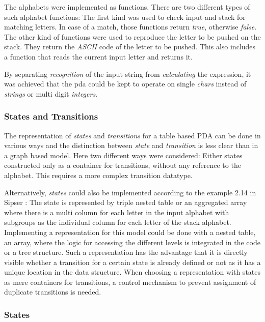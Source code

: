 \documentclass[a4paper,11pt,twoside]{article}
\begin{document}
The alphabets were implemented as functions. There are two different
types of such alphabet functions: The first kind was used to check
input and stack for matching letters. In case of a match, those
functions return \textit{true}, otherwise \textit{false}. The other
kind of functions were used to reproduce the letter to be pushed on the
stack. They return the \textit{ASCII} code of the letter to be pushed. This
also includes a function that reads the current input letter and  
returns it.

By separating \textit{recognition} of the input string from
\textit{calculating} the expression, it was achieved that the pda
could be kept to operate on single \textit{chars} instead of
\textit{strings} or multi digit \textit{integers}.  

\subsubsection{States and Transitions}
The representation of \textit{states} and \textit{transitions} for
a table based PDA can be done in various ways and the distinction
between \textit{state} and \textit{transition} is less clear than in a
graph based model. Here two different ways were considered: Either
states constructed only as a container for transitions, without any 
reference to the alphabet. This requires a more complex
transition datatype. 

Alternatively, \textit{states} could also be implemented according to
the example 2.14 in Sipser \cite[p. 114]{sipser2012}: The state is
represented by triple nested table or
an aggregated array where there is a multi column for each letter in
the input alphabet with subgroups as the individual column for each
letter of the stack alphabet. Implementing a representation for this
model could be done with a nested table, an array, where the logic for
accessing the different levels is integrated in the code or a tree
structure. Such a representation has the advantage that it is directly
visible whether a transition for a certain state is already defined or
not as it has a unique location in the data structure. When choosing a
representation with states as mere containers for transitions, a
control mechanism to prevent assignment of duplicate transitions is
needed. 

\subsubsection{States}
\end{document}
